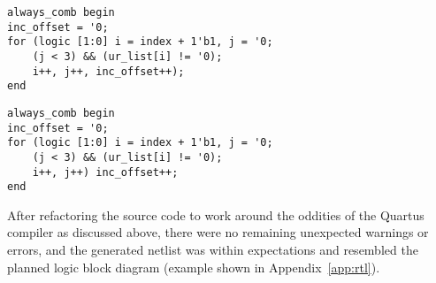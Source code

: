 \begin{listing}[H]
	\begin{verbatim}
always_comb begin
inc_offset = '0;
for (logic [1:0] i = index + 1'b1, j = '0;
    (j < 3) && (ur_list[i] != '0);
    i++, j++, inc_offset++);
end
\end{verbatim}
\end{listing}
\begin{code}
	\begin{verbatim}
always_comb begin
inc_offset = '0;
for (logic [1:0] i = index + 1'b1, j = '0;
    (j < 3) && (ur_list[i] != '0);
    i++, j++) inc_offset++;
end
\end{verbatim}
\end{code}
After refactoring the source code to work around the oddities of the Quartus compiler as discussed above, there were no remaining unexpected warnings or errors, and the generated netlist was within expectations and resembled the planned logic block diagram (example shown in Appendix~\ref{app:rtl}).